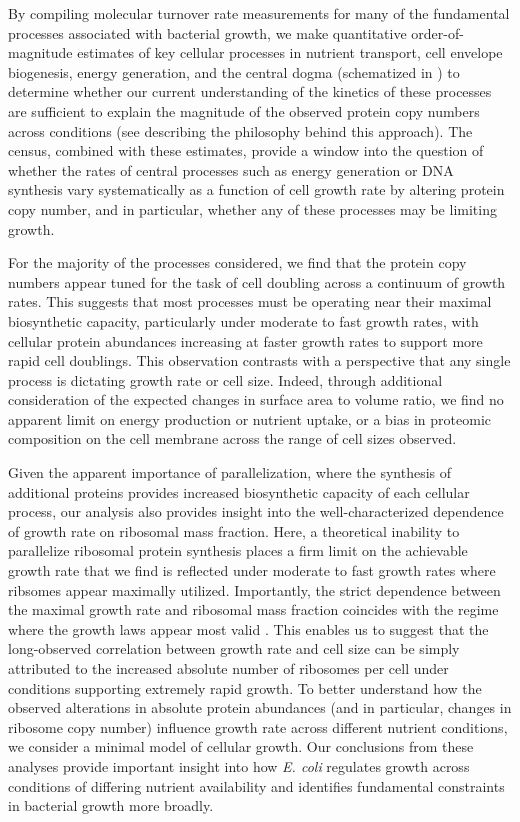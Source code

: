 By compiling molecular turnover rate measurements for many of the
fundamental processes associated with bacterial growth, we make quantitative
order-of-magnitude estimates of key cellular processes in nutrient transport,
cell envelope biogenesis, energy generation, and the central dogma (schematized
in ) to determine whether our current understanding of the
kinetics of these processes are sufficient to explain the magnitude of the
observed protein copy numbers across conditions (see 
describing the philosophy behind this approach). The census, combined with these
estimates, provide a window into the question of whether the rates of central
processes such as energy generation or DNA synthesis vary systematically as a
function of cell growth rate by altering protein copy number, and in particular,
whether any of these processes may be limiting growth.

For the majority of the processes considered, we find that the protein copy
numbers appear tuned for the task of cell doubling across a continuum of growth
rates. This suggests that most processes must be operating near their maximal
biosynthetic capacity, particularly under moderate to fast growth rates, with
cellular protein abundances increasing at faster growth rates to support more
rapid cell doublings. This observation contrasts with a perspective that any
single process is dictating growth rate or cell size. Indeed, through
additional consideration of the expected changes in surface area to volume
ratio, we find no apparent limit on energy production or nutrient uptake, or a
bias in proteomic composition on the cell membrane across the range of cell
sizes observed.

Given the apparent importance of parallelization, where the synthesis of
additional proteins provides increased biosynthetic capacity of each cellular
process, our analysis also provides insight into the well-characterized
dependence of growth rate on ribosomal mass fraction. Here, a theoretical
inability to parallelize ribosomal protein synthesis places a firm limit on the
achievable growth rate that we find is reflected under moderate to fast growth
rates where ribsomes appear maximally utilized. Importantly, the strict
dependence between the maximal growth rate and ribosomal mass fraction coincides
with the regime where the growth laws appear most valid \citep{amir2017,
scott2010}. This enables us to suggest that the long-observed correlation
between growth rate and cell size \citep{schaechter1958, si2017} can be simply
attributed to the increased absolute number of ribosomes per cell under
conditions supporting extremely rapid growth. To better understand how the
observed alterations in absolute protein abundances (and in particular, changes
in ribosome copy number) influence growth rate across different nutrient
conditions, we consider a minimal model of cellular growth. Our conclusions from
these analyses provide important insight into how \textit{E. coli} regulates
growth across conditions of differing nutrient availability and identifies
fundamental constraints in bacterial growth more broadly.




